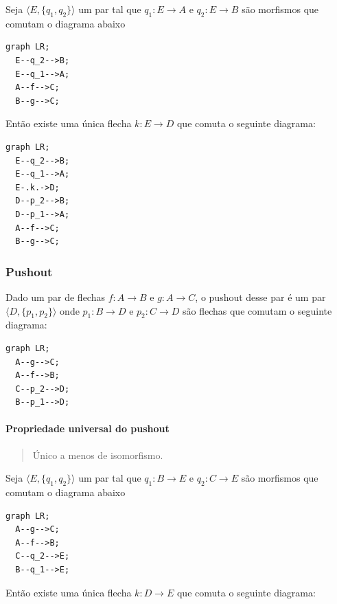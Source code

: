 Seja \(\langle E, \{q_1, q_2\}\rangle\) um par tal que
\(q_1 : E \rightarrow A\) e \(q_2 : E \rightarrow B\) são morfismos que
comutam o diagrama abaixo

\begin{verbatim}
graph LR;
  E--q_2-->B;
  E--q_1-->A;
  A--f-->C;
  B--g-->C;
\end{verbatim}

Então existe uma única flecha \(k : E \rightarrow D\) que comuta o
seguinte diagrama:

\begin{verbatim}
graph LR;
  E--q_2-->B;
  E--q_1-->A;
  E-.k.->D;
  D--p_2-->B;
  D--p_1-->A;
  A--f-->C;
  B--g-->C;
\end{verbatim}

\hypertarget{pushout}{%
\subsubsection{Pushout}\label{pushout}}

Dado um par de flechas \(f : A \rightarrow B\) e
\(g : A \rightarrow C\), o pushout desse par é um par
\(\langle D, \{ p_1, p_2 \} \rangle\) onde \(p_1 : B \rightarrow D\) e
\(p_2 : C \rightarrow D\) são flechas que comutam o seguinte diagrama:

\begin{verbatim}
graph LR;
  A--g-->C;
  A--f-->B;
  C--p_2-->D;
  B--p_1-->D;
\end{verbatim}

\hypertarget{propriedade-universal-do-pushout}{%
\paragraph{Propriedade universal do
pushout}\label{propriedade-universal-do-pushout}}

\begin{quote}
Único a menos de isomorfismo.
\end{quote}

Seja \(\langle E, \{q_1, q_2\}\rangle\) um par tal que
\(q_1 : B \rightarrow E\) e \(q_2 : C \rightarrow E\) são morfismos que
comutam o diagrama abaixo

\begin{verbatim}
graph LR;
  A--g-->C;
  A--f-->B;
  C--q_2-->E;
  B--q_1-->E;
\end{verbatim}

Então existe uma única flecha \(k : D \rightarrow E\) que comuta o
seguinte diagrama:

